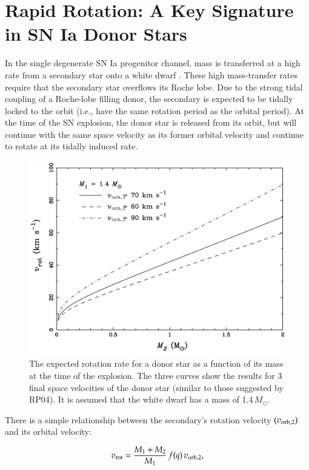 \section{Rapid Rotation: A Key Signature in SN Ia Donor Stars}
\label{sec:sn1572_starg_rot}
In the single degenerate SN Ia progenitor channel, mass is transferred
at a high rate from a secondary star onto a white dwarf \citep{Nomoto:1982p451,Nomoto:2007p480}. These high
mass-transfer rates require that the secondary star overflows its
Roche lobe. Due to the strong tidal coupling of a Roche-lobe filling
donor, the secondary is expected to be tidally locked to the orbit
(i.e., have the same rotation period as the orbital period).  At the
time of the SN explosion, the donor star is released from its orbit, but
will continue with the same space velocity as its former orbital
velocity and continue to rotate at its tidally induced rate.

\begin{figure}[h!]
\centering
\includegraphics*[width=\textwidth]{chapter_sn1572_starg/plots/theo_rot_podsi.pdf}
\caption{The expected rotation rate for a donor star as a function of
its mass at the time of the explosion. The three curves show the results for 3 final space
velocities of the donor star (similar to those suggested by RP04). It
is assumed that the white dwarf has a mass of 1.4\,$M_\odot$.}
\label{fig:theorot}
\end{figure}

There is a simple relationship between the secondary's rotation
velocity $(v_{\rm orb, 2})$ and its orbital velocity:

$$ v_{\rm rot} = {M_1 + M_2\over M_1}\,f(q)\,v_{\rm orb, 2} ,$$

